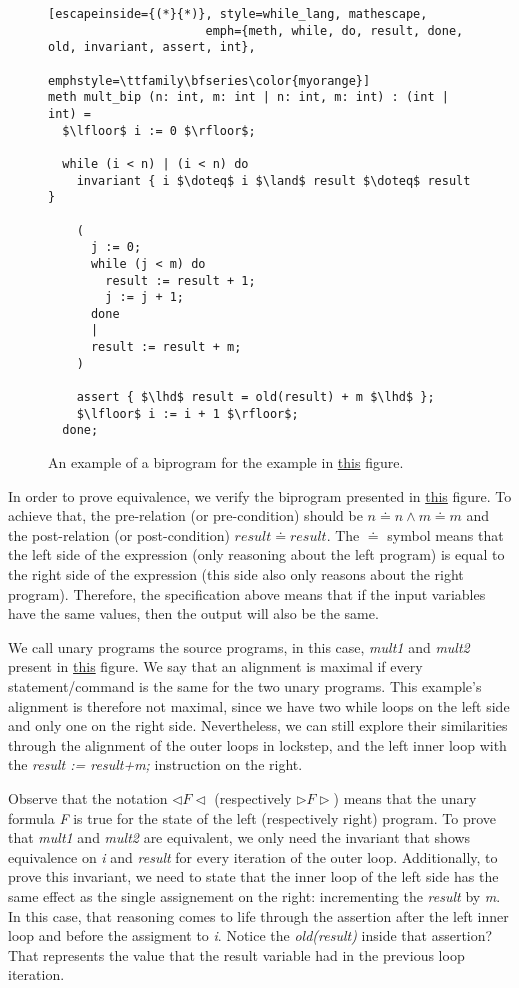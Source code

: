 \begin{figure}[h]
  \centering
  \noindent
  \begin{lstlisting}[escapeinside={(*}{*)}, style=while_lang, mathescape,
                      emph={meth, while, do, result, done, old, invariant, assert, int},
                      emphstyle=\ttfamily\bfseries\color{myorange}]
meth mult_bip (n: int, m: int | n: int, m: int) : (int | int) =
  $\lfloor$ i := 0 $\rfloor$;

  while (i < n) | (i < n) do
    invariant { i $\doteq$ i $\land$ result $\doteq$ result }

    (
      j := 0;
      while (j < m) do
        result := result + 1;
        j := j + 1;
      done
      |
      result := result + m;
    )

    assert { $\lhd$ result = old(result) + m $\lhd$ };
    $\lfloor$ i := i + 1 $\rfloor$;
  done;
  \end{lstlisting}
  \caption{An example of a biprogram for the example in \hyperref[fig:mult_source_programs]{this} figure.}
  \label{fig:mult_biprogram}
\end{figure}

In order to prove equivalence, we verify the biprogram presented in \hyperref[fig:mult_biprogram]{this} figure.
To achieve that, the pre-relation (or pre-condition) should be \(n \doteq n \land m \doteq m \) and the post-relation (or post-condition) \(result \doteq result\).
The $\doteq$ symbol means that the left side of the expression (only reasoning about the left program) is equal to the right side of the expression (this side also only reasons about the right program).
Therefore, the specification above means that if the input variables have the same values, then the output will also be the same.

We call unary programs the source programs, in this case, \emph{mult1} and \emph{mult2} present in \hyperref[fig:mult_source_programs]{this} figure.
We say that an alignment is maximal if every statement/command is the same for the two unary programs.
This example's alignment is therefore not maximal, since we have two while loops on the left side and only one on the right side.
Nevertheless, we can still explore their similarities through the alignment of the outer loops in lockstep, and the left inner loop with the \emph{result := result+m;} instruction on the right.

Observe that the notation $\lhd F \lhd$ (respectively $\rhd F \rhd$) means that the unary formula \emph{F} is true for the state of the left (respectively right) program.
To prove that \emph{mult1} and \emph{mult2} are equivalent, we only need the invariant that shows equivalence on \emph{i} and \emph{result} for every iteration of the outer loop.
Additionally, to prove this invariant, we need to state that the inner loop of the left side has the same effect as the single assignement on the right: incrementing the \emph{result} by \emph{m}.
In this case, that reasoning comes to life through the assertion after the left inner loop and before the assigment to \emph{i}.
Notice the \emph{old(result)} inside that assertion? 
That represents the value that the result variable had in the previous loop iteration.


